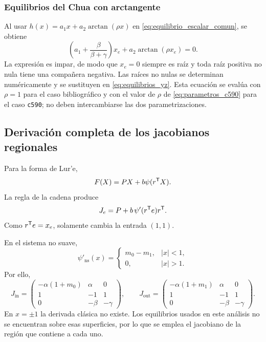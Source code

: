 \subsubsection{Equilibrios del Chua con arctangente}

Al usar
\(h(x)=a_1x+a_2\arctan(\rho x)\) en
\cref{eq:equilibrio_escalar_comun}, se obtiene
\begin{equation}
\left(a_1+\frac{\beta}{\beta+\gamma}\right)x_e
+a_2\arctan(\rho x_e)=0.
\label{eq:equilibrio_escalar_arctan}
\end{equation}
La expresión es impar, de modo que \(x_e=0\) siempre es raíz y toda raíz
positiva no nula tiene una compañera negativa. Las raíces no nulas se
determinan numéricamente y se sustituyen en \cref{eq:equilibrios_yz}. Esta
ecuación se evalúa con \(\rho=1\) para el caso bibliográfico y con el valor de
\(\rho\) de \cref{eq:parametros_c590} para el caso \texttt{c590}; no deben
intercambiarse las dos parametrizaciones.

\fi
\ifnum{}\relax
\subsection{Derivación completa de los jacobianos regionales}
\label{app:jacobianos}

Para la forma de Lur'e,
\[
F(X)=PX+b\psi(r^{\mathsf T}X).
\]
La regla de la cadena produce
\begin{equation}
J_e=P+b\,\psi'(r^{\mathsf T}e)r^{\mathsf T}.
\label{eq:jacobiano_lure}
\end{equation}
Como \(r^{\mathsf T}e=x_e\), solamente cambia la entrada \((1,1)\).

En el sistema no suave,
\[
\psi'_{\mathrm{ns}}(x)=
\begin{cases}
m_0-m_1,&|x|<1,\\
0,&|x|>1.
\end{cases}
\]
Por ello,
\begin{equation}
J_{\mathrm{in}}=
\begin{pmatrix}
-\alpha(1+m_0)&\alpha&0\\
1&-1&1\\
0&-\beta&-\gamma
\end{pmatrix},
\qquad
J_{\mathrm{out}}=
\begin{pmatrix}
-\alpha(1+m_1)&\alpha&0\\
1&-1&1\\
0&-\beta&-\gamma
\end{pmatrix}.
\label{eq:jacobianos_ns}
\end{equation}
En \(x=\pm1\) la derivada clásica no existe. Los equilibrios usados en este
análisis no se encuentran sobre esas superficies, por lo que se emplea el
jacobiano de la región que contiene a cada uno.

